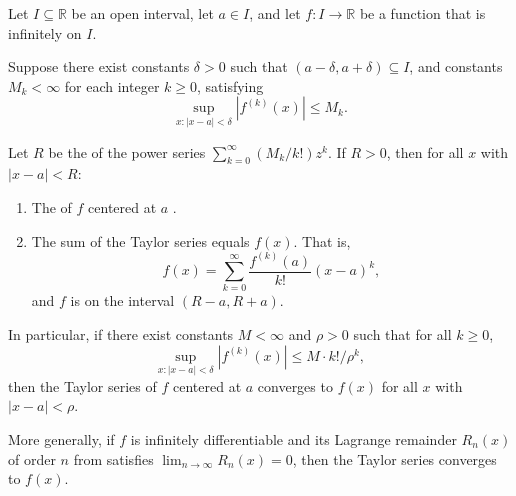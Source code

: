 \begin{theorem} \label{theorem:taylor_series_convergence_criterion_for_real_valued_functions_on_a_real_interval}
Let $I \subseteq \mathbb{R}$ be an open interval, let $a \in I$, and let $f : I \to \mathbb{R}$ be a function that is infinitely  on $I$.

Suppose there exist constants $\delta > 0$ such that $(a - \delta, a + \delta) \subseteq I$, and constants $M_k < \infty$ for each integer $k \geq 0$, satisfying
$$\sup_{x : |x - a| < \delta} |f^{(k)}(x)| \leq M_k.$$

Let $R$ be the  of the power series $\sum_{k=0}^\infty (M_k / k!) z^k$. If $R > 0$, then for all $x$ with $|x - a| < R$:
\begin{enumerate}
    \item The  of $f$ centered at $a$ .
    \item The sum of the Taylor series equals $f(x)$. That is,
        $$f(x) = \sum_{k=0}^\infty \frac{f^{(k)}(a)}{k!}(x - a)^k,$$
    and $f$ is  on the interval $(R-a, R+a)$.
\end{enumerate}

In particular, if there exist constants $M < \infty$ and $\rho > 0$ such that for all $k \geq 0$,
$$\sup_{x : |x - a| < \delta} |f^{(k)}(x)| \leq M \cdot k! / \rho^k,$$
then the Taylor series of $f$ centered at $a$ converges to $f(x)$ for all $x$ with $|x - a| < \rho$.

More generally, if $f$ is infinitely differentiable and its Lagrange remainder $R_n(x)$ of order $n$ from  satisfies $\lim_{n \to \infty} R_n(x) = 0$, then the Taylor series converges to $f(x)$.
\end{theorem}

